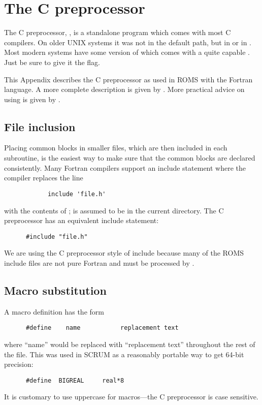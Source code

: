 \section{The C preprocessor}
\label{Cpp}

The C preprocessor, , is a standalone program which comes
with most C compilers. On older UNIX systems it was not in the default
path, but in  or in . Most modern systems
have some version of  which comes with a quite capable
. Just be sure to give it the  flag.

This Appendix describes the C preprocessor as used in ROMS with the
Fortran language.  A more complete description is given by
\cite{K&R}.  More practical advice on using
 is given by \cite{Hazard}.

\subsection{File inclusion}
Placing common blocks in smaller files, which are then included in each
subroutine, is the easiest way to make sure that the common blocks are
declared consistently.  Many Fortran compilers support an include
statement where the compiler replaces the line
\begin{verbatim}
            include 'file.h'
\end{verbatim}
with the contents of ;  is assumed
to be in the current directory.  The C preprocessor has an equivalent
include statement:
\begin{verbatim}
      #include "file.h"
\end{verbatim}
We are using the C preprocessor style of include because many of the
ROMS include files are not pure Fortran and must be processed by
.

\subsection{Macro substitution}
A macro definition has the form
\begin{verbatim}
      #define    name           replacement text
\end{verbatim}
where ``name'' would be replaced with ``replacement text''
throughout the rest of the file.  This was used in SCRUM as a
reasonably portable way to get 64-bit precision:
\begin{verbatim}
      #define  BIGREAL     real*8
\end{verbatim}
It is customary to use uppercase for  macros---the C
preprocessor is case sensitive.

